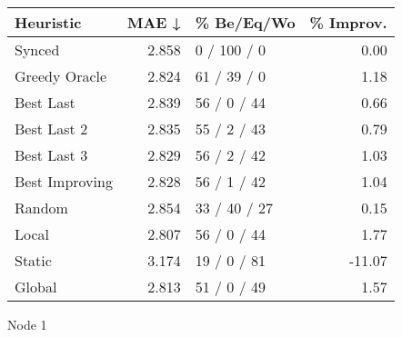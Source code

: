 \begin{tabular}{lrlr}
\toprule
\textbf{Heuristic} & \textbf{MAE ↓} & \textbf{\% Be/Eq/Wo} & \textbf{\% Improv.} \\
\midrule
            Synced &          2.858 &          0 / 100 / 0 &                0.00 \\
     Greedy Oracle &          2.824 &          61 / 39 / 0 &                1.18 \\
         Best Last &          2.839 &          56 / 0 / 44 &                0.66 \\
       Best Last 2 &          2.835 &          55 / 2 / 43 &                0.79 \\
       Best Last 3 &          2.829 &          56 / 2 / 42 &                1.03 \\
    Best Improving &          2.828 &          56 / 1 / 42 &                1.04 \\
            Random &          2.854 &         33 / 40 / 27 &                0.15 \\
             Local &          2.807 &          56 / 0 / 44 &                1.77 \\
            Static &          3.174 &          19 / 0 / 81 &              -11.07 \\
            Global &          2.813 &          51 / 0 / 49 &                1.57 \\
\bottomrule
\end{tabular}
\caption{Node 1}
\label{tab:ds_non_lr01_le1_bs2_1}
